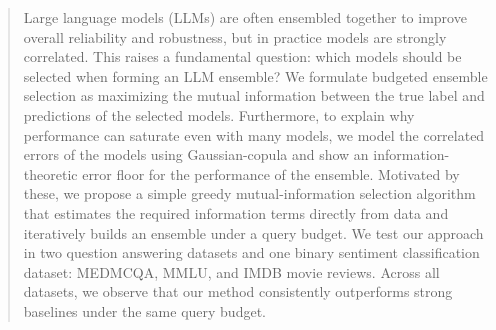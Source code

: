 \documentclass{article}
\theoremstyle{plain}
\theoremstyle{definition}
\theoremstyle{remark}
\begin{document}


\begin{abstract}
Large language models (LLMs) are often ensembled together to improve overall reliability and robustness, but in practice models are strongly correlated. This raises a fundamental question: which models should be selected when forming an LLM ensemble? We formulate budgeted ensemble selection as maximizing the mutual information between the true label and predictions of the selected models. Furthermore, to explain why performance can saturate even with many models, we model the correlated errors of the models using Gaussian-copula and show an information-theoretic error floor for the performance of the ensemble. Motivated by these, we propose a simple greedy mutual-information selection algorithm that estimates the required information terms directly from data and iteratively builds an ensemble under a query budget. We test our approach in two question answering datasets and one binary sentiment classification dataset: MEDMCQA, MMLU, and IMDB movie reviews. Across all datasets, we observe that our method consistently outperforms strong baselines under the same query budget.
\end{abstract}
\end{document}
